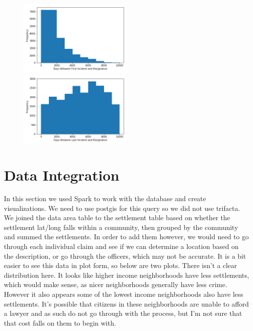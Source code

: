 \documentclass[11pt]{article}
\begin{document}
\begin{figure}[h!]
\includegraphics[width=0.5\textwidth]{complaint2.png}
\includegraphics[width=0.5\textwidth]{complaint3.png}
\end{figure}

\FloatBarrier
\section{Data Integration}

In this section we used Spark to work with the database and create visualizations. We need to use postgis for this query so we did not use trifacta. We joined the data area table to the settlement table based on whether the settlement lat/long falls within a community, then grouped by the community and summed the settlements. In order to add them however, we would need to go through each individual claim and see if we can determine a location based on the description, or go through the officers, which may not be accurate. It is a bit easier to see this data in plot form, so below are two plots. There isn't a clear distribution here. It looks like higher income neighborhoods have less settlements, which would make sense, as nicer neighborhoods generally have less crime. However it also appears some of the lowest income neighborhoods
also have less settlements. It's possible that citizens in these neighborhoods are unable to afford a lawyer and as such do not go through with the process, but I'm not sure that that cost falls on them to begin with.
\end{document}

